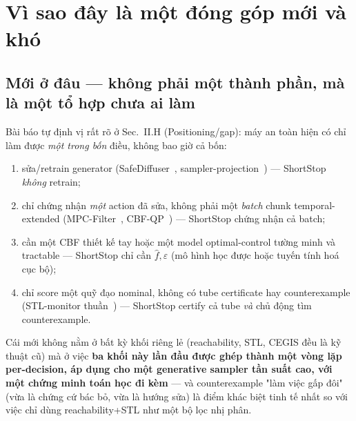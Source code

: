 \documentclass[a4paper,12pt]{article}
\let\stdsection\section
\renewcommand{\section}{\clearpage\stdsection}
\begin{document}
\section{Vì sao đây là một đóng góp mới và khó}\label{sec:novelty}
\subsection{Mới ở đâu — không phải một thành phần, mà là một tổ hợp chưa ai làm}
Bài báo tự định vị rất rõ ở Sec.~II.H (Positioning/gap): máy an toàn hiện có chỉ làm được \emph{một trong bốn} điều, không bao giờ cả bốn:
\begin{enumerate}[label=(\roman*)]
  \item sửa/retrain generator (SafeDiffuser~\cite{xiao2023safediffuser}, sampler-projection~\cite{power2023sampling}) --- ShortStop \emph{không} retrain;
  \item chỉ chứng nhận \emph{một} action đã sửa, không phải một \emph{batch} chunk temporal-extended (MPC-Filter~\cite{wabersich2021predictive}, CBF-QP~\cite{ames2017cbf}) --- ShortStop chứng nhận cả batch;
  \item cần một CBF thiết kế tay hoặc một model optimal-control tường minh và tractable --- ShortStop chỉ cần $\hat f,\varepsilon$ (mô hình học được hoặc tuyến tính hoá cục bộ);
  \item chỉ score một quỹ đạo nominal, không có tube certificate hay counterexample (STL-monitor thuần~\cite{deshmukh2017robust}) --- ShortStop certify cả tube \emph{và} chủ động tìm counterexample.
\end{enumerate}
Cái mới không nằm ở bất kỳ khối riêng lẻ (reachability, STL, CEGIS đều là kỹ thuật cũ) mà ở việc \textbf{ba khối này lần đầu được ghép thành một vòng lặp per-decision, áp dụng cho một generative sampler tần suất cao, với một chứng minh toán học đi kèm} --- và counterexample "làm việc gấp đôi" (vừa là chứng cứ bác bỏ, vừa là hướng sửa) là điểm khác biệt tinh tế nhất so với việc chỉ dùng reachability+STL như một bộ lọc nhị phân.
\end{document}
